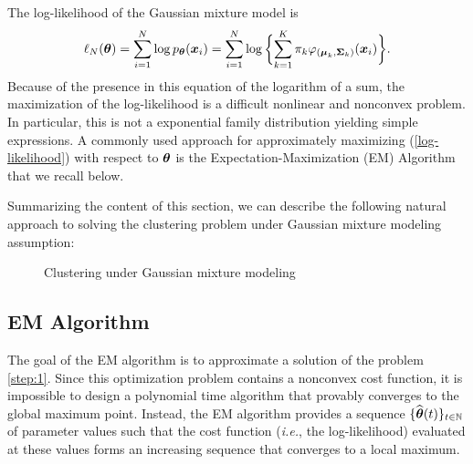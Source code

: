 The log-likelihood of the Gaussian mixture model is
\begin{equation}\label{log-likelihood}
\ell_N({\boldsymbol\theta})=\sum_{i=1}^{N}\log{p_{{\boldsymbol\theta}}(\boldsymbol x_i)}=
\sum_{i=1}^{N}\log\bigg\{{\sum_{k=1}^K\pi_k\varphi_{(\boldsymbol\mu_{k},\boldsymbol\Sigma_{k})}(\boldsymbol x_i)}\bigg\}.
\end{equation}
Because of the presence in this equation of the logarithm of a sum, the maximization of the log-likelihood is
a difficult nonlinear and nonconvex problem. In particular, this is not a exponential family distribution yielding simple expressions.
A commonly used approach for approximately maximizing (\ref{log-likelihood}) with respect to ${\boldsymbol\theta}$ is the Expectation-Maximization
(EM) Algorithm \citep{dempster77} that we recall below.

Summarizing the content of this section, we can describe the following  natural approach to solving the clustering problem under Gaussian
mixture modeling assumption:
\begin{figure}[h]
\begin{center}
   \caption{Clustering under Gaussian mixture modeling}
   \label{algo:general}
\end{center}
\vspace{-15pt}
\end{figure}
\subsection{EM Algorithm}
\label{sec:EM_algo}
The goal of the EM algorithm is to approximate a solution of the problem \eqref{step:1}.
Since this optimization problem contains a nonconvex cost function, it is impossible to
design a polynomial time algorithm that provably converges to the global maximum point. Instead,
the EM algorithm provides a sequence $\{\widehat{{\boldsymbol\theta}}(t)\}_{t\in{\mathbb N}}$ of parameter values such that
the cost function (\textit{i.e.}, the log-likelihood) evaluated at these values forms an
increasing sequence that converges to a local maximum.

